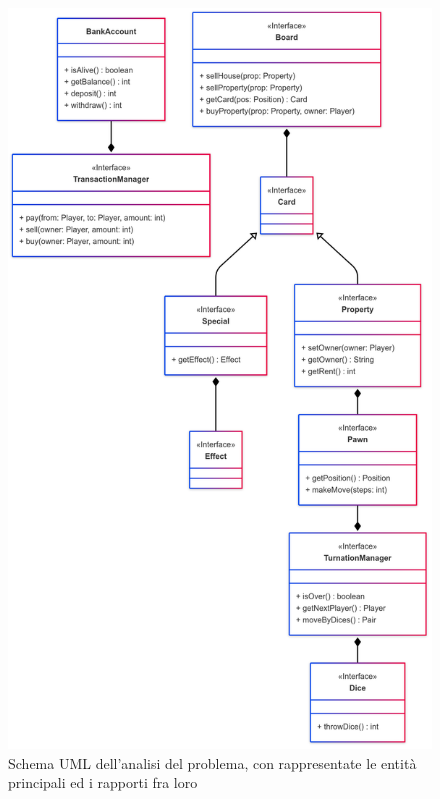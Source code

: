 \begin{figure}[H]
    \centering
    \includegraphics[width=0.5\textheight]{img/architecture_diagram.png}
    \caption{Schema UML dell'analisi del problema, con rappresentate le entità principali ed i rapporti fra loro}
	\label{img:architecture_diagram}
\end{figure}
